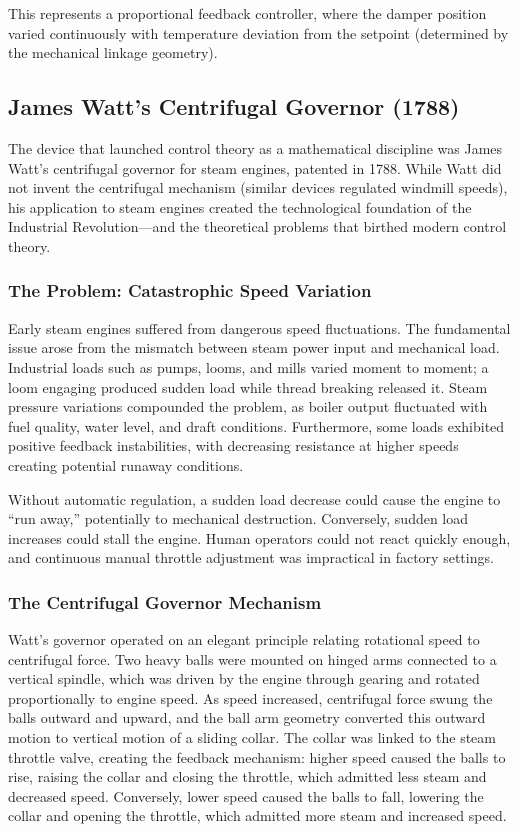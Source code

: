 This represents a proportional feedback controller, where the damper position varied continuously with temperature deviation from the setpoint (determined by the mechanical linkage geometry).

\subsection{James Watt's Centrifugal Governor (1788)}
\label{subsec:watt}

The device that launched control theory as a mathematical discipline was James Watt's centrifugal governor for steam engines, patented in 1788. While Watt did not invent the centrifugal mechanism (similar devices regulated windmill speeds), his application to steam engines created the technological foundation of the Industrial Revolution---and the theoretical problems that birthed modern control theory.

\subsubsection{The Problem: Catastrophic Speed Variation}

Early steam engines suffered from dangerous speed fluctuations. The fundamental issue arose from the mismatch between steam power input and mechanical load. Industrial loads such as pumps, looms, and mills varied moment to moment; a loom engaging produced sudden load while thread breaking released it. Steam pressure variations compounded the problem, as boiler output fluctuated with fuel quality, water level, and draft conditions. Furthermore, some loads exhibited positive feedback instabilities, with decreasing resistance at higher speeds creating potential runaway conditions.

Without automatic regulation, a sudden load decrease could cause the engine to ``run away,'' potentially to mechanical destruction. Conversely, sudden load increases could stall the engine. Human operators could not react quickly enough, and continuous manual throttle adjustment was impractical in factory settings.

\subsubsection{The Centrifugal Governor Mechanism}

Watt's governor operated on an elegant principle relating rotational speed to centrifugal force. Two heavy balls were mounted on hinged arms connected to a vertical spindle, which was driven by the engine through gearing and rotated proportionally to engine speed. As speed increased, centrifugal force swung the balls outward and upward, and the ball arm geometry converted this outward motion to vertical motion of a sliding collar. The collar was linked to the steam throttle valve, creating the feedback mechanism: higher speed caused the balls to rise, raising the collar and closing the throttle, which admitted less steam and decreased speed. Conversely, lower speed caused the balls to fall, lowering the collar and opening the throttle, which admitted more steam and increased speed.

